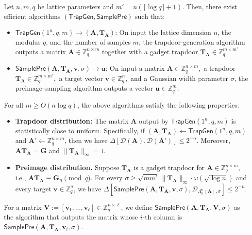 \begin{lemma}
\label{lem:gadget_trapdoor}
Let $n,m,q$ be lattice parameters and
$m' = n(\lceil \log q \rceil + 1).$
Then, there exist efficient algorithms $(\mathsf{TrapGen}, \mathsf{SamplePre})$ such that:
\begin{itemize}
    \item $\mathsf{TrapGen}(1^n, q, m) \to (\mathbf{A}, \mathbf{T}_{\mathbf{A}})$:
    On input the lattice dimension $n$, the modulus $q$, and the number of samples $m$, the trapdoor-generation algorithm outputs a matrix
    $\mathbf{A} \in \mathbb{Z}_q^{n \times m}$
    together with a gadget trapdoor
    $\mathbf{T}_{\mathbf{A}} \in \mathbb{Z}_q^{m \times m'}$

    \item $\mathsf{SamplePre}(\mathbf{A}, \mathbf{T}_{\mathbf{A}}, \mathbf{v}, \sigma) \to \mathbf{u}$:
    On input a matrix
    $\mathbf{A} \in \mathbb{Z}_q^{n \times m},$
    a trapdoor
    $\mathbf{T}_{\mathbf{A}} \in \mathbb{Z}_q^{m \times m'},$
    a target vector
    $\mathbf{v} \in \mathbb{Z}_q^n,$
    and a Gaussian width parameter $\sigma$, the preimage-sampling algorithm outputs a vector
    $\mathbf{u} \in \mathbb{Z}_q^m.$
\end{itemize}

For all $m \ge O(n \log q)$, the above algorithms satisfy the following properties:
\begin{itemize}
    \item \textbf{Trapdoor distribution:}
    The matrix $\mathbf{A}$ output by $\mathsf{TrapGen}(1^n,q,m)$ is statistically close to uniform. Specifically, if
    $(\mathbf{A},\mathbf{T}_{\mathbf{A}}) \leftarrow \mathsf{TrapGen}(1^n,q,m)$ and
    $\mathbf{A}' \leftarrow \mathbb{Z}_q^{n\times m}$, then we have
    $\Delta[\mathcal{D}(\mathbf{A}),\mathcal{D}(\mathbf{A}')] \le 2^{-n}$.
    Moreover,
    $\mathbf{A}\mathbf{T}_{\mathbf{A}} = \mathbf{G}$
    and
    $\|\mathbf{T}_{\mathbf{A}}\|_{\infty} = 1$.

    \item \textbf{Preimage distribution.}
        Suppose $\mathbf{T}_{\mathbf{A}}$ is a gadget trapdoor for
        $\mathbf{A} \in \mathbb{Z}_q^{n \times m}$, i.e.,
        $\mathbf{A}\mathbf{T}_{\mathbf{A}} \equiv \mathbf{G}_n \pmod q$.
        For every
        $
        \sigma \ge
        \sqrt{mm'}\,\|\mathbf{T}_{\mathbf{A}}\|_{\infty}
        \cdot \omega(\sqrt{\log n})
        $
        and every target $\mathbf{v} \in \mathbb{Z}_q^n$, we have
        $
        \Delta\!\left[
        \mathsf{SamplePre}
        (\mathbf{A},\mathbf{T}_{\mathbf{A}},\mathbf{v},\sigma),
        \mathcal{D}_{\Lambda_q^{\mathbf{v}}(\mathbf{A}),\sigma}
        \right]
        \le 2^{-n}.
        $
\end{itemize}

For a matrix
$\mathbf{V} := [\mathbf{v}_1,\ldots,\mathbf{v}_{\ell}] \in \mathbb{Z}_q^{n\times \ell}$,
we define $\mathsf{SamplePre}(\mathbf{A},\mathbf{T}_{\mathbf{A}},\mathbf{V},\sigma)$ as the algorithm that outputs the matrix whose $i$-th column is
$\mathsf{SamplePre}(\mathbf{A},\mathbf{T}_{\mathbf{A}},\mathbf{v}_i,\sigma)$.
\end{lemma}



